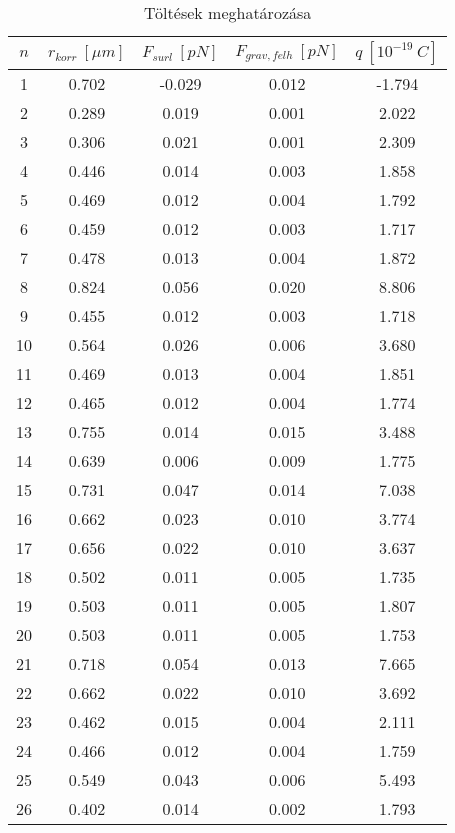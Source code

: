 \documentclass[a4paper]{article}
\begin{document}
\begin{table}[h!]\centering
	\caption{Töltések meghatározása}
	\vspace{0.3cm}
	\begin{tabular}{|c|c|c|c|c|}
		
		\hline
		$n$ & $r_{korr}\ [\mu m]$ & $F_{surl}\ [pN] $& $F_{grav,felh}\ [pN]$ & $q\ [10^{-19}\ C]$ \\ \hline
		1 & 0.702 & -0.029 & 0.012 & -1.794 \\ \hline
		2 & 0.289 & 0.019 & 0.001 & 2.022 \\ \hline
		3 & 0.306 & 0.021 & 0.001 & 2.309 \\ \hline
		4 & 0.446 & 0.014 & 0.003 & 1.858 \\ \hline
		5 & 0.469 & 0.012 & 0.004 & 1.792 \\ \hline
		6 & 0.459 & 0.012 & 0.003 & 1.717 \\ \hline
		7 & 0.478 & 0.013 & 0.004 & 1.872 \\ \hline
		8 & 0.824 & 0.056 & 0.020 & 8.806 \\ \hline
		9 & 0.455 & 0.012 & 0.003 & 1.718 \\ \hline
		10 & 0.564 & 0.026 & 0.006 & 3.680 \\ \hline
		11 & 0.469 & 0.013 & 0.004 & 1.851 \\ \hline
		12 & 0.465 & 0.012 & 0.004 & 1.774 \\ \hline
		13 & 0.755 & 0.014 & 0.015 & 3.488 \\ \hline
		14 & 0.639 & 0.006 & 0.009 & 1.775 \\ \hline
		15 & 0.731 & 0.047 & 0.014 & 7.038 \\ \hline
		16 & 0.662 & 0.023 & 0.010 & 3.774 \\ \hline
		17 & 0.656 & 0.022 & 0.010 & 3.637 \\ \hline
		18 & 0.502 & 0.011 & 0.005 & 1.735 \\ \hline
		19 & 0.503 & 0.011 & 0.005 & 1.807 \\ \hline
		20 & 0.503 & 0.011 & 0.005 & 1.753 \\ \hline
		21 & 0.718 & 0.054 & 0.013 & 7.665 \\ \hline
		22 & 0.662 & 0.022 & 0.010 & 3.692 \\ \hline
		23 & 0.462 & 0.015 & 0.004 & 2.111 \\ \hline
		24 & 0.466 & 0.012 & 0.004 & 1.759 \\ \hline
		25 & 0.549 & 0.043 & 0.006 & 5.493 \\ \hline
		26 & 0.402 & 0.014 & 0.002 & 1.793 \\ \hline
	\end{tabular}
	
\end{table}
\end{document}
